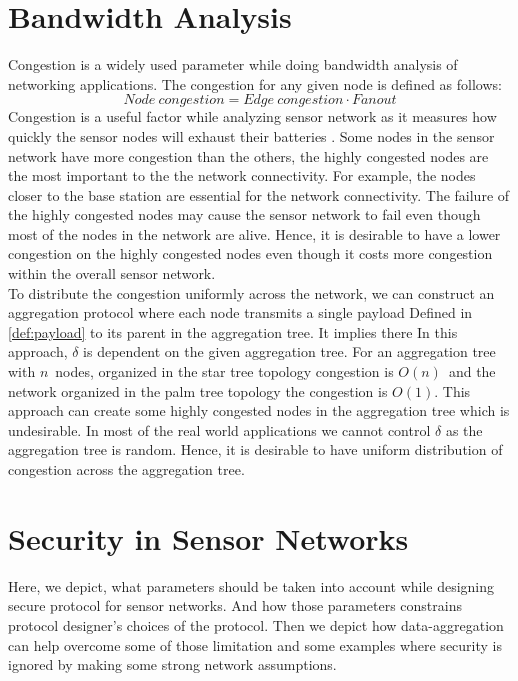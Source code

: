 \section{Bandwidth Analysis}
	Congestion is a widely used parameter while doing bandwidth analysis of networking applications.
	The congestion for any given node is defined as follows:
	\begin{equation}\label{def:congestion}
		Node\ congestion = Edge\ congestion \cdot Fanout
	\end{equation}
	Congestion is a useful factor while analyzing sensor network as it measures how quickly the sensor nodes will exhaust their batteries \cite{madden2003design}. 
	Some nodes in the sensor network have more congestion than the others, the highly congested nodes are the most important to the the network connectivity.
	For example, the nodes closer to the base station are essential for the network connectivity.
	The failure of the highly congested nodes may cause the sensor network to fail even though most of the nodes in the network are alive.
	Hence, it is desirable to have a lower congestion on the highly congested nodes even though it costs more congestion within the overall sensor network.\\
	To distribute the congestion uniformly across the network, we can construct an aggregation protocol where each node transmits a single payload Defined in \ref{def:payload} to its parent in the aggregation tree.
	It implies there 
	In this approach, $\delta$ is dependent on the given aggregation tree.
	For an aggregation tree with $n$\ nodes, organized in the star tree topology congestion is $O(n)$\ and the network organized in the palm tree topology the congestion is $O(1)$.
	This approach can create some highly congested nodes in the aggregation tree which is undesirable.
	In most of the real world applications we cannot control $\delta$ as the aggregation tree is random.
	Hence, it is desirable to have uniform distribution of congestion across the aggregation tree.



\section{Security in Sensor Networks}
	\label{sec:aggregate-adversary}
	Here, we depict, what parameters should be taken into account while designing secure protocol for sensor networks.  
	And how those parameters constrains protocol designer's choices of the protocol.
	Then we depict how data-aggregation can help overcome some of those limitation and some examples where security is ignored by making some strong network assumptions.

